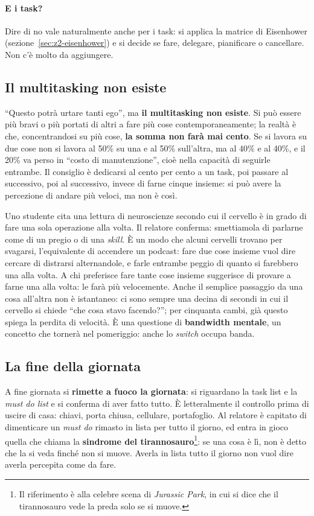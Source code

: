 \paragraph{E i task?} Dire di no vale naturalmente anche per i task: si applica la
matrice di Eisenhower (sezione~\ref{sec:z2-eisenhower}) e si decide se fare,
delegare, pianificare o cancellare. Non c'è molto da aggiungere.

\subsection{Il multitasking non esiste}

``Questo potrà urtare tanti ego'', ma \textbf{il multitasking non esiste}. Si può
essere più bravi o più portati di altri a fare più cose contemporaneamente; la
realtà è che, concentrandosi su più cose, \textbf{la somma non farà mai cento}. Se
si lavora su due cose non si lavora al 50\% su una e al 50\% sull'altra, ma al 40\%
e al 40\%, e il 20\% va perso in ``costo di manutenzione'', cioè nella capacità di
seguirle entrambe. Il consiglio è dedicarsi al cento per cento a un task, poi
passare al successivo, poi al successivo, invece di farne cinque insieme: si può
avere la percezione di andare più veloci, ma non è così.

Uno studente cita una lettura di neuroscienze secondo cui il cervello è in grado
di fare una sola operazione alla volta. Il relatore conferma: smettiamola di
parlarne come di un pregio o di una \emph{skill}. È un modo che alcuni cervelli
trovano per svagarsi, l'equivalente di accendere un podcast: fare due cose
insieme vuol dire cercare di distrarsi alternandole, e farle entrambe peggio di
quanto si farebbero una alla volta. A chi preferisce fare tante cose insieme
suggerisce di provare a farne una alla volta: le farà più velocemente. Anche il
semplice passaggio da una cosa all'altra non è istantaneo: ci sono sempre una
decina di secondi in cui il cervello si chiede ``che cosa stavo facendo?''; per
cinquanta cambi, già questo spiega la perdita di velocità. È una questione di
\textbf{bandwidth mentale}, un concetto che tornerà nel pomeriggio: anche lo
\emph{switch} occupa banda.

\subsection{La fine della giornata}

A fine giornata si \textbf{rimette a fuoco la giornata}: si riguardano la task list
e la \emph{must do list} e si conferma di aver fatto tutto. È letteralmente il
controllo prima di uscire di casa: chiavi, porta chiusa, cellulare, portafoglio.
Al relatore è capitato di dimenticare un \emph{must do} rimasto in lista per tutto
il giorno, ed entra in gioco quella che chiama la \textbf{sindrome del
tirannosauro}\footnote{Il riferimento è alla celebre scena di \emph{Jurassic Park},
in cui si dice che il tirannosauro vede la preda solo se si muove.}: se una cosa è
lì, non è detto che la si veda finché non si muove. Averla in lista tutto il giorno
non vuol dire averla percepita come da fare.

